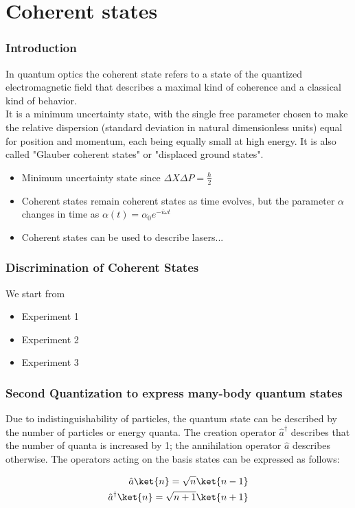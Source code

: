 \documentclass{beamer}
\begin{document}
\section{Coherent states}
\begin{frame}
  \frametitle{Introduction}
  In quantum optics the coherent state refers to a state of the quantized electromagnetic field
  that describes a maximal kind of coherence and a classical kind of behavior.\\
  It is a minimum uncertainty state, with the single free parameter chosen to make the relative
  dispersion (standard deviation in natural dimensionless units) equal for position and momentum,
  each being equally small at high energy. It is also called "Glauber coherent states" or "displaced ground states".
  \begin{itemize}
    \item Minimum uncertainty state since $\Delta{X}\Delta{P}=\frac{\hbar}{2}$
    \item Coherent states remain coherent states as time
          evolves, but the parameter $\alpha$ changes in time as
          $\alpha(t) = \alpha_{0}e^{-i\omega t}$
    \item Coherent states can be used to describe lasers...
  \end{itemize}
\end{frame}

\begin{frame}
  \frametitle{Discrimination of Coherent States}
  We start from
  \begin{itemize}
    \item Experiment 1
    \item Experiment 2
    \item Experiment 3
  \end{itemize}
\end{frame}

\begin{frame}[label=frame6]
  \frametitle{Second Quantization to express many-body quantum states}
  Due to indistinguishability of particles, the quantum state can be described by the number of particles
  or energy quanta.
  The creation operator $\hat{a}^\dagger$ describes that the number of quanta is increased by 1; the annihilation
  operator $\hat{a}$ describes otherwise.
  The operators acting on the basis states can be expressed as follows:

  \begin{align}
    \hat{a}\ket{n} = \sqrt{n}\ket{n-1} \\
    \hat{a}^{\dagger}\ket{n} = \sqrt{n+1}\ket{n+1}
  \end{align}
\end{frame}
\end{document}
